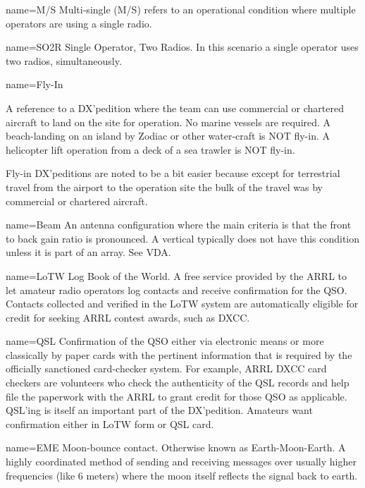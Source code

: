  { name={{M/S}} }
{
Multi-single (M/S) refers to an operational condition where multiple
operators are using a single radio.
}


 { name={{SO2R}} }
{
Single Operator, Two Radios.  In this scenario a single operator
uses two radios, simultaneously.
}

 { name={{Fly-In}} }
{
A reference to a DX'pedition where the team can use commercial
or chartered aircraft to land on the site for operation.  No marine
vessels are required.  A beach-landing on an island by Zodiac or other
water-craft is NOT fly-in.   A helicopter lift operation from a deck
of a sea trawler is NOT fly-in.   
\par
Fly-in DX'peditions are noted to be a bit easier because except for
terrestrial travel from the airport to the operation site the bulk of the
travel was by commercial or chartered aircraft.
}

 { name={{Beam}} }
{ 
An antenna configuration where the main criteria is that the front to back
gain ratio is pronounced.  A vertical typically does not have this 
condition unless it is part of an array.  See VDA.
}

 { name={{LoTW}} }
{
Log Book of the World.  A free service provided by the ARRL
to let amateur radio operators log contacts and receive
confirmation for the QSO.  Contacts collected and verified
in the LoTW system are automatically eligible for credit
for seeking ARRL contest awards, such as DXCC.
}

 { name={{QSL}} }
{
Confirmation of the QSO either via electronic means
or more classically by paper cards with the pertinent
information that is required by the officially sanctioned
card-checker system.  For example, ARRL DXCC card checkers
are volunteers who check the authenticity of the QSL records
and help file the paperwork with the ARRL to grant credit
for those QSO as applicable.  QSL'ing is itself an important
part of the DX'pedition.  Amateurs want confirmation either
in LoTW form or QSL card.}

 { name={{EME}} }
{
Moon-bounce contact.  Otherwise known as Earth-Moon-Earth.  A
highly coordinated method of sending and receiving messages
over usually higher frequencies (like 6 meters) where the moon
itself reflects the signal back to earth.
}


